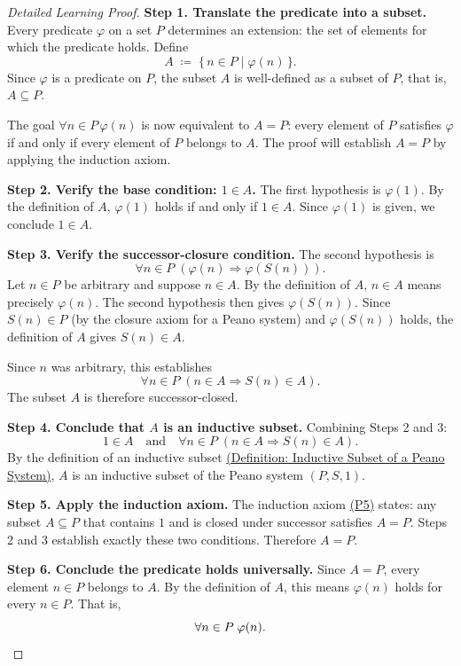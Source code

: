 \begin{proof}[Detailed Learning Proof]
\LRAProofBodyStart

\textbf{Step 1. Translate the predicate into a subset.}
Every predicate $\varphi$ on a set $P$ determines an extension: the set of
elements for which the predicate holds. Define
\[
  A \;\coloneqq\; \{\,n \in P \mid \varphi(n)\,\}.
\]
Since $\varphi$ is a predicate on $P$, the subset $A$ is well-defined as a
subset of $P$, that is, $A \subseteq P$.  

The goal $\forall n \in P\,\varphi(n)$ is now equivalent to $A = P$: every
element of $P$ satisfies $\varphi$ if and only if every element of $P$
belongs to $A$. The proof will establish $A = P$ by applying the induction
axiom.

\textbf{Step 2. Verify the base condition: $1 \in A$.}
The first hypothesis is $\varphi(1)$.
By the definition of $A$, $\varphi(1)$ holds if and only if $1 \in A$.
Since $\varphi(1)$ is given, we conclude $1 \in A$.

\textbf{Step 3. Verify the successor-closure condition.}
The second hypothesis is
\[
  \forall n \in P\;(\varphi(n) \Longrightarrow \varphi(S(n))).
\]
Let $n \in P$ be arbitrary and suppose $n \in A$.
By the definition of $A$, $n \in A$ means precisely $\varphi(n)$.
The second hypothesis then gives $\varphi(S(n))$.
Since $S(n) \in P$ (by the closure axiom for a Peano system) and
$\varphi(S(n))$ holds, the definition of $A$ gives $S(n) \in A$.

Since $n$ was arbitrary, this establishes
\[
  \forall n \in P\;(n \in A \Longrightarrow S(n) \in A).
\]
The subset $A$ is therefore successor-closed.

\textbf{Step 4. Conclude that $A$ is an inductive subset.}
Combining Steps 2 and 3:
\[
  1 \in A
  \quad\text{and}\quad
  \forall n \in P\;(n \in A \Longrightarrow S(n) \in A).
\]
By the definition of an inductive subset
\hyperref[def:inductive-subset-of-peano-system]{(Definition: Inductive Subset of a Peano System)},
$A$ is an inductive subset of the Peano system $(P,S,1)$.

\textbf{Step 5. Apply the induction axiom.}
The induction axiom \hyperref[ax:peano-induction]{(P5)} states: any subset
$A \subseteq P$ that contains $1$ and is closed under successor satisfies
$A = P$. Steps 2 and 3 establish exactly these two conditions. Therefore
$A = P$.

\textbf{Step 6. Conclude the predicate holds universally.}
Since $A = P$, every element $n \in P$ belongs to $A$. By the definition of
$A$, this means $\varphi(n)$ holds for every $n \in P$. That is,
\[
  \forall n \in P\;\varphi(n). \qedhere
\]
\end{proof}

